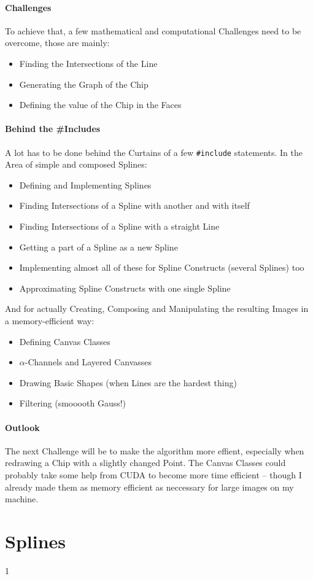 \documentclass[10pt]{article}
\newcommand\behindIncludes{1}
\begin{document}
\paragraph{Challenges}
    To achieve that, a few mathematical and computational Challenges need to be overcome, those are mainly:
    \begin{itemize}
        \item Finding the Intersections of the Line
        \item Generating the Graph of the Chip
        \item Defining the value of the Chip in the Faces
    \end{itemize}
\paragraph{Behind the \#Includes}
    A lot has to be done behind the Curtains of a few {\tt \#include} statements.
    In the Area of simple and composed Splines:
    \begin{itemize}
        \item Defining and Implementing Splines
        \item Finding Intersections of a Spline with another and with itself
        \item Finding Intersections of a Spline with a straight Line
        \item Getting a part of a Spline as a new Spline
        \item Implementing almost all of these for Spline Constructs (several Splines) too
        \item Approximating Spline Constructs with one single Spline
    \end{itemize}
    And for actually Creating, Composing and Manipulating the resulting Images in a memory-efficient way:
    \begin{itemize}
        \item Defining Canvas Classes
        \item $\alpha$-Channels and Layered Canvasses
        \item Drawing Basic Shapes (when Lines are the hardest thing)
        \item Filtering (smooooth Gauss!)
    \end{itemize}
\paragraph{Outlook}
    The next Challenge will be to make the algorithm more effient, especially when redrawing a Chip with a slightly changed Point.
    The Canvas Classes could probably take some help from CUDA to become more time efficient – though I already made them as memory efficient as neccessary for large images on my machine.
\section{Splines}
    
    \if\behindIncludes1
        
        \newpage
    \fi

\newpage


\end{document}
